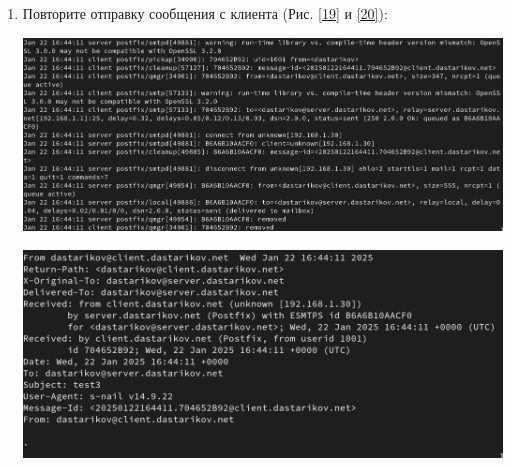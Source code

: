 \begin{enumerate}
\item Повторите отправку сообщения с клиента (Рис. \ref{19} и \ref{20}):
\begin{center}
    \centering
    \includegraphics[width=\textwidth]{../images/image19.png}
    \label{19}
\end{center}
\begin{center}
    \centering
    \includegraphics[width=\textwidth]{../images/image20.png}
    \label{20}
\end{center}
\end{enumerate}

